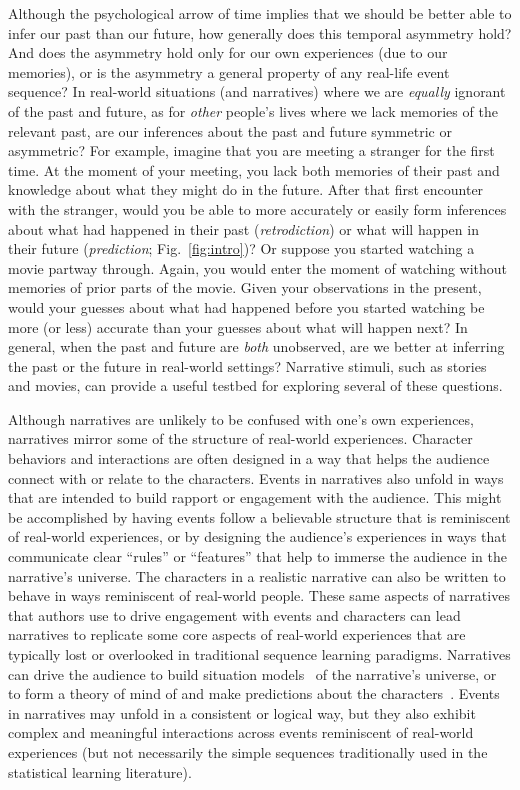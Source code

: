 \documentclass[10pt]{article}
\begin{document}
Although the psychological arrow of time implies that we should be better able to infer our past than our future, how generally does this temporal asymmetry hold? And does the asymmetry hold only for our own experiences (due to our memories), or is the asymmetry a general property of any real-life event sequence? In real-world situations (and narratives) where we are \textit{equally} ignorant of the past and future, as for \textit{other} people's lives where we lack memories of the relevant past, are our inferences about the past and future symmetric or asymmetric? For example, imagine that you are meeting a stranger for the first time. At the moment of your meeting, you lack both memories of their past and knowledge about what they might do in the future. After that first encounter with the stranger, would you be able to more accurately or easily form inferences about what had happened in their past (\textit{retrodiction}) or what will happen in their future (\textit{prediction}; Fig.~\ref{fig:intro})? Or suppose you started watching a movie partway through. Again, you would enter the moment of watching without memories of prior parts of the movie. Given your observations in the present, would your guesses about what had happened before you started watching be more (or less) accurate than your guesses about what will happen next? In general, when the past and future are \textit{both} unobserved, are we better at inferring the past or the future in real-world settings? Narrative stimuli, such as stories and movies, can provide a useful testbed for exploring several of these questions.

Although narratives are unlikely to be confused with one's own experiences, narratives mirror some of the structure of real-world experiences. Character behaviors and interactions are often designed in a way that helps the audience connect with or relate to the characters. Events in narratives also unfold in ways that are intended to build rapport or engagement with the audience. This might be accomplished by having events follow a believable structure that is reminiscent of real-world experiences, or by designing the audience's experiences in ways that communicate clear ``rules'' or ``features'' that help to immerse the audience in the narrative's universe.  The characters in a realistic narrative can also be written to behave in ways reminiscent of real-world people. These same aspects of narratives that authors use to drive engagement with events and characters can lead narratives to replicate some core aspects of real-world experiences that are typically lost or overlooked in traditional sequence learning paradigms. Narratives can drive the audience to build situation models~\citep{RadvCope06, ZwaaRadv98} of the narrative's universe, or to form a theory of mind of and make predictions about the characters~\citep{TamiThor18, KostSaxe13}. Events in narratives may unfold in a consistent or logical way, but they also exhibit complex and meaningful interactions across events reminiscent of real-world experiences (but not necessarily the simple sequences traditionally used in the statistical learning literature).
\end{document}
